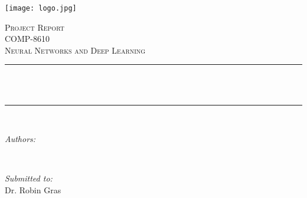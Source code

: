 \begin{titlepage}
	
	\newcommand{\HRule}{\rule{\linewidth}{0.5mm}} %
	
	\centering
	\texttt{[image: logo.jpg]}\\[1cm] %
	
	
	\center %
	
	
	\textsc{\LARGE Project Report}\\[1.5cm] 
	\textsc{\Large COMP-8610}\\[0.5cm] 
	\textsc{\large Neural Networks and Deep Learning}\\[0.5cm] 
	
	\makeatletter
	\HRule \\[0.4cm]
	{ \huge \bfseries \@title}\\[0.4cm] %
	\HRule \\[1.5cm]
	
	
	\begin{minipage}{0.4\textwidth}
		\begin{flushleft} \large
			\emph{Authors:}\\
			\@author %
			
			
			
		\end{flushleft}
	\end{minipage}
	~
	\begin{minipage}{0.4\textwidth}
		\begin{flushright} \large
			\emph{Submitted to:} \\
			Dr. Robin Gras \\[1.2em] 
		\end{flushright}
	\end{minipage}\\[2cm]
	\makeatother
	

\end{titlepage}
